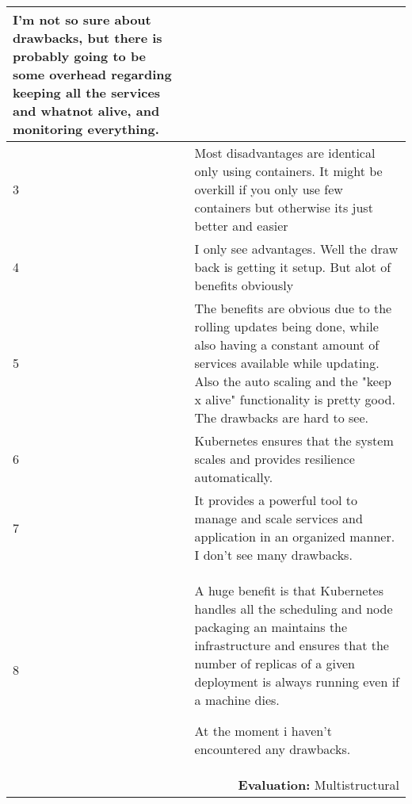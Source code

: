 \begin{longtable}{|p{0.3cm}|p{14.7cm}|}
\noindent I'm not so sure about drawbacks, but there is probably going to be some overhead regarding keeping all the services and whatnot alive, and monitoring everything. \\ \hline

3 & Most disadvantages are identical only using containers. It might be overkill if you only use few containers but otherwise its just better and easier \\ \hline

4 & I only see advantages. Well the draw back is getting it setup. But alot of benefits obviously \\ \hline

5 & The benefits are obvious due to the rolling updates being done, while also having a constant amount of services available while updating. Also the auto scaling and the "keep x alive" functionality is pretty good. The drawbacks are hard to see. \\ \hline

6 & Kubernetes ensures that the system scales and provides resilience automatically. \\ \hline

7 & It provides a powerful tool to manage and scale services and application in an organized manner. I don't see many drawbacks. \\ \hline

8 & A huge benefit is that Kubernetes handles all the scheduling and node packaging an maintains the infrastructure and ensures that the number of replicas of a given deployment is always running even if a machine dies. 

\noindent At the moment i haven't encountered any drawbacks. \\ \hline

\multicolumn{2}{r}{\textbf{Evaluation:} Multistructural} \\ 
\end{longtable}
\normalsize

